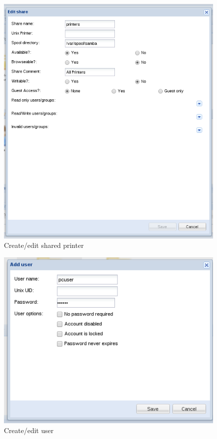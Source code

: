 \begin{figure}[H]
    \begin{center}
    \includegraphics[scale=0.38]{screenshots/etfs/etfs_edit_printer_share.png}
    \caption{Create/edit shared printer}
    \label{fig:etfs_edit_printer_share}
    \end{center}
\end{figure}

\begin{figure}[H]
    \begin{center}
    \includegraphics[scale=0.38]{screenshots/etfs/etfs_edit_user.png}
    \caption{Create/edit user}
    \label{fig:etfs_edit_user}
    \end{center}
\end{figure}

